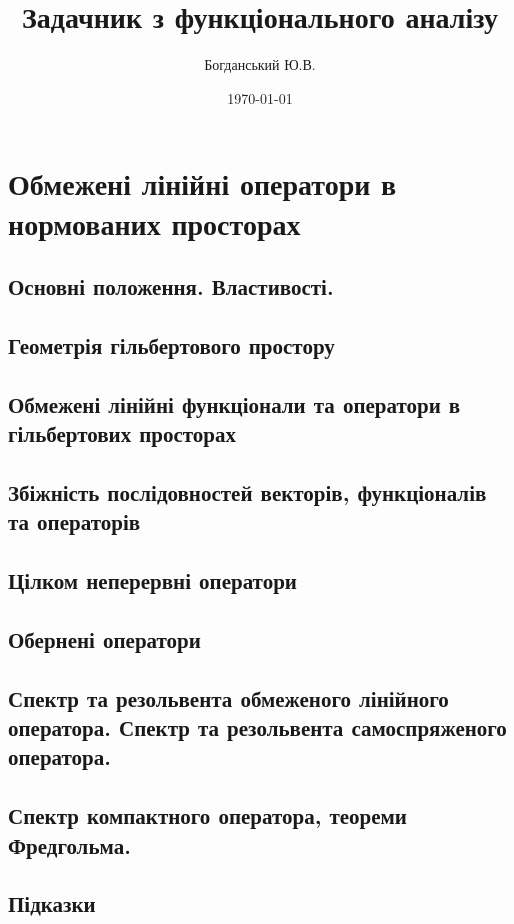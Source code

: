 \documentclass{extreport}
\author{Богданський Ю.В.}
\title{Задачник з функціонального аналізу}
\date{\today}
\begin{document}
    \maketitle
    \tableofcontents
    \chapter{Обмежені лінійні оператори в нормованих просторах}
        \section{Основні положення. Властивості.}
            
            
            
        \section{Геометрія гільбертового простору}
            
            
            
            
        \section{Обмежені лінійні функціонали та оператори в гільбертових просторах}
            
            
            
            
        \section{Збіжність послідовностей векторів, функціоналів та операторів}
            
            
            
        \section{Цілком неперервні оператори}
            
            
            
              
        \section{Обернені оператори}
            
            
            
        \section{Спектр та резольвента обмеженого лінійного оператора. 
                 Спектр та резольвента самоспряженого оператора.}
            
            
            
        \section{Спектр компактного оператора, теореми Фредгольма.}
            
        \newpage
        \section*{Підказки}
            
\end{document}
